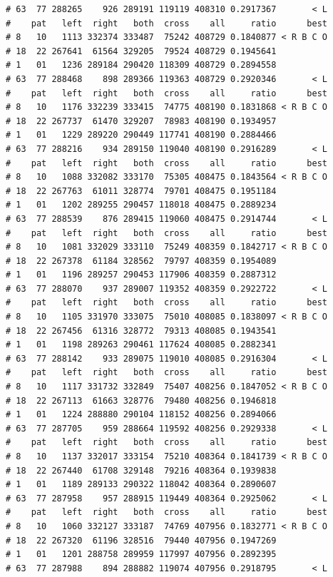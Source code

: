 \documentclass{article}\usepackage[]{graphicx}\usepackage[]{color}
\makeatletter
\newenvironment{kframe}{%
 \def\at@end@of@kframe{}%
 \ifinner\ifhmode%
  \def\at@end@of@kframe{\end{minipage}}%
  \begin{minipage}{\columnwidth}%
 \fi\fi%
 \def\FrameCommand##1{\hskip\@totalleftmargin \hskip-\fboxsep
 \colorbox{shadecolor}{##1}\hskip-\fboxsep
     \hskip-\linewidth \hskip-\@totalleftmargin \hskip\columnwidth}%
 \MakeFramed {\advance\hsize-\width
   \@totalleftmargin\z@ \linewidth\hsize
   \@setminipage}}%
 {\par\unskip\endMakeFramed%
 \at@end@of@kframe}
\newenvironment{knitrout}{}{} %
\makeatother
\begin{document}
\begin{knitrout}
\begin{kframe}
\begin{verbatim}
# 63  77 288265    926 289191 119119 408310 0.2917367       < L
#    pat   left  right   both  cross    all     ratio      best
# 8   10   1113 332374 333487  75242 408729 0.1840877 < R B C O
# 18  22 267641  61564 329205  79524 408729 0.1945641          
# 1   01   1236 289184 290420 118309 408729 0.2894558          
# 63  77 288468    898 289366 119363 408729 0.2920346       < L
#    pat   left  right   both  cross    all     ratio      best
# 8   10   1176 332239 333415  74775 408190 0.1831868 < R B C O
# 18  22 267737  61470 329207  78983 408190 0.1934957          
# 1   01   1229 289220 290449 117741 408190 0.2884466          
# 63  77 288216    934 289150 119040 408190 0.2916289       < L
#    pat   left  right   both  cross    all     ratio      best
# 8   10   1088 332082 333170  75305 408475 0.1843564 < R B C O
# 18  22 267763  61011 328774  79701 408475 0.1951184          
# 1   01   1202 289255 290457 118018 408475 0.2889234          
# 63  77 288539    876 289415 119060 408475 0.2914744       < L
#    pat   left  right   both  cross    all     ratio      best
# 8   10   1081 332029 333110  75249 408359 0.1842717 < R B C O
# 18  22 267378  61184 328562  79797 408359 0.1954089          
# 1   01   1196 289257 290453 117906 408359 0.2887312          
# 63  77 288070    937 289007 119352 408359 0.2922722       < L
#    pat   left  right   both  cross    all     ratio      best
# 8   10   1105 331970 333075  75010 408085 0.1838097 < R B C O
# 18  22 267456  61316 328772  79313 408085 0.1943541          
# 1   01   1198 289263 290461 117624 408085 0.2882341          
# 63  77 288142    933 289075 119010 408085 0.2916304       < L
#    pat   left  right   both  cross    all     ratio      best
# 8   10   1117 331732 332849  75407 408256 0.1847052 < R B C O
# 18  22 267113  61663 328776  79480 408256 0.1946818          
# 1   01   1224 288880 290104 118152 408256 0.2894066          
# 63  77 287705    959 288664 119592 408256 0.2929338       < L
#    pat   left  right   both  cross    all     ratio      best
# 8   10   1137 332017 333154  75210 408364 0.1841739 < R B C O
# 18  22 267440  61708 329148  79216 408364 0.1939838          
# 1   01   1189 289133 290322 118042 408364 0.2890607          
# 63  77 287958    957 288915 119449 408364 0.2925062       < L
#    pat   left  right   both  cross    all     ratio      best
# 8   10   1060 332127 333187  74769 407956 0.1832771 < R B C O
# 18  22 267320  61196 328516  79440 407956 0.1947269          
# 1   01   1201 288758 289959 117997 407956 0.2892395          
# 63  77 287988    894 288882 119074 407956 0.2918795       < L

\end{verbatim}
\end{kframe}
\end{knitrout}
\end{document}

